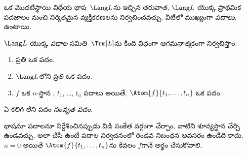 \documentclass[../../../include/open-logic-section]{subfiles}
\begin{document}


ఒక మొదటిస్థాయి విధేయ భాష~$\Lang L$ను ఇచ్చిన తరువాత, $\Lang L$ యొక్క
ప్రాథమిక పదజాలం నుంచి నిర్మితమైన వ్యక్తీకరణలను నిర్వచించవచ్చు.
వీటిలో ముఖ్యంగా \emph{పదాలు}, \emph{} ఉంటాయి.

\begin{defn}[పదాలు]
$\Lang L$ యొక్క \emph{పదాల} సమితి~$\Trm[L]$ను కింది విధంగా
ఆగమనాత్మకంగా నిర్వచిస్తాం:
\begin{enumerate}
\item ప్రతి  ఒక పదం.
\item $\Lang L$లోని ప్రతి  ఒక పదం.
\item $f$ ఒక $n$-స్థాన , $t_1$, \dots, $t_n$ పదాలు అయితే,
  $\Atom{f}{t_1, \ldots, t_n}$ ఒక పదం.
\end{enumerate}
ఏ  కలిగి లేని పదం \emph{సంవృత పదం}.
\end{defn}

\begin{explain}
భాషనూ పదాలనూ నిర్దేశించినప్పుడు  విడి సంకేత
వర్గంగా చేర్చాం. వాటిని శూన్యస్థాన  చేర్చి
ఉండవచ్చు. అలా చేసి ఉంటే పదాల నిర్వచనంలో రెండవ నిబంధన అవసరం ఉండేది కాదు.
$n = 0$ అయితే $\Atom{f}{t_1, \ldots, t_n}$ను కేవలం $f$గానే
అర్థం చేసుకోవాలి.
\end{explain}
\end{document}
